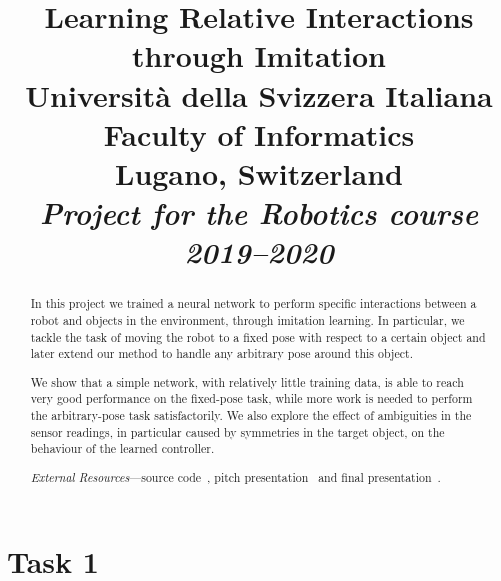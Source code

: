 \documentclass[conference]{IEEEtran}
\begin{document}
\title{Learning Relative Interactions through Imitation \\ \vspace{0.5\baselineskip}
{
	\large {Università della Svizzera Italiana}\\
	{Faculty of Informatics} \\
	Lugano, Switzerland \\
	\textit{Project for the Robotics course 2019--2020}\\
}
}

\author{
\and
{}
}

\maketitle
\thispagestyle{plain}
\pagestyle{plain}

\begin{abstract}
In this project we trained a neural network to perform specific interactions 
between a robot and objects in the environment, through imitation learning. In 
particular, we tackle the task of moving the robot to a fixed pose with respect 
to a certain object and later extend our method to handle any arbitrary pose 
around this object.

We show that a simple network, with relatively little training data, is able to 
reach very good performance on the fixed-pose task, while more work is needed 
to perform the arbitrary-pose task satisfactorily. We also explore the effect 
of ambiguities in the sensor readings, in particular caused by symmetries in 
the target object, on the behaviour of the learned controller.

\emph{External Resources}---source code~\cite{github}, pitch 
presentation~\cite{pitch} and final presentation~\cite{final-pitch}.

\end{abstract}





\section{Task 1}
\label{sec:task1}












\end{document}
